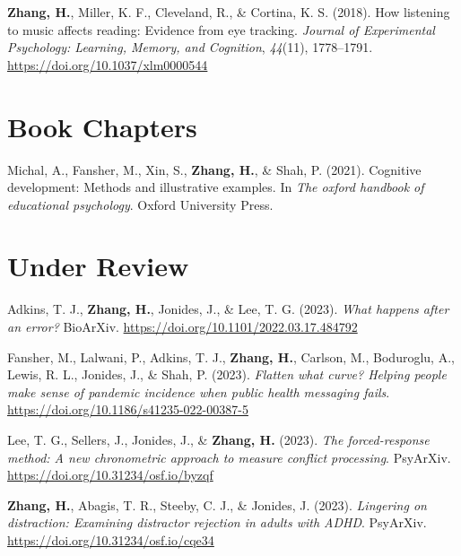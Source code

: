 \documentclass[11pt,a4paper,]{awesome-cv}
\begin{document}
\leavevmode{}%
\textbf{Zhang, H.}, Miller, K. F., Cleveland, R., \& Cortina, K. S.
(2018). How listening to music affects reading: Evidence from eye
tracking. \emph{Journal of Experimental Psychology: Learning, Memory,
and Cognition}, \emph{44}(11), 1778--1791.
\url{https://doi.org/10.1037/xlm0000544}

\hypertarget{book-chapters}{%
\section{Book Chapters}\label{book-chapters}}

\hypertarget{bibliography}{}
\leavevmode{}%
Michal, A., Fansher, M., Xin, S., \textbf{Zhang, H.}, \& Shah, P.
(2021). Cognitive development: Methods and illustrative examples. In
\emph{The oxford handbook of educational psychology}. Oxford University
Press.

\hypertarget{under-review}{%
\section{Under Review}\label{under-review}}

\hypertarget{bibliography}{}
\leavevmode{}%
Adkins, T. J., \textbf{Zhang, H.}, Jonides, J., \& Lee, T. G. (2023).
\emph{What happens after an error?} BioArXiv.
\url{https://doi.org/10.1101/2022.03.17.484792}

\leavevmode{}%
Fansher, M., Lalwani, P., Adkins, T. J., \textbf{Zhang, H.}, Carlson,
M., Boduroglu, A., Lewis, R. L., Jonides, J., \& Shah, P. (2023).
\emph{Flatten what curve? Helping people make sense of pandemic
incidence when public health messaging fails}.
\url{https://doi.org/10.1186/s41235-022-00387-5}

\leavevmode{}%
Lee, T. G., Sellers, J., Jonides, J., \& \textbf{Zhang, H.} (2023).
\emph{The forced-response method: A new chronometric approach to measure
conflict processing}. PsyArXiv.
\url{https://doi.org/10.31234/osf.io/byzqf}

\leavevmode{}%
\textbf{Zhang, H.}, Abagis, T. R., Steeby, C. J., \& Jonides, J. (2023).
\emph{Lingering on distraction: Examining distractor rejection in adults
with ADHD}. PsyArXiv. \url{https://doi.org/10.31234/osf.io/cqe34}
\end{document}
